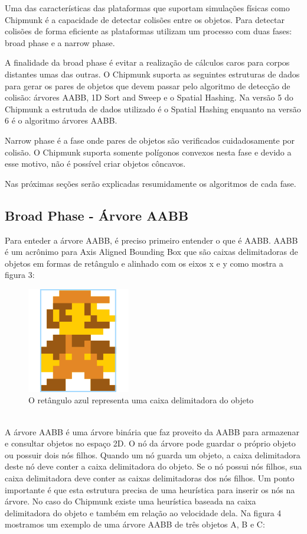 Uma das características das plataformas que suportam simulações físicas como Chipmunk é a capacidade de detectar colisões entre os objetos. 
Para detectar colisões de forma eficiente as plataformas utilizam um processo com duas fases: broad phase e a narrow phase. 

A finalidade da broad phase é evitar a realização de cálculos caros para corpos distantes umas das outras. O Chipmunk suporta as seguintes estruturas de dados para
gerar os pares de objetos que devem passar pelo algoritmo de detecção de colisão:
árvores AABB, 1D Sort and Sweep e o Spatial Hashing. Na versão 5 do Chipmunk a estrutuda de dados utilizado é o Spatial Hashing enquanto na versão 6
é o algoritmo árvores AABB. 

Narrow phase é a fase onde pares de objetos são verificados cuidadosamente por colisão. O Chipmunk suporta somente polígonos convexos nesta fase e devido a 
esse motivo, não é possível criar objetos côncavos.

Nas próximas seções serão explicadas resumidamente os algoritmos de cada fase.

\subsection{Broad Phase - Árvore AABB}

Para enteder a árvore AABB, é preciso primeiro entender o que é AABB. AABB é um acrônimo para Axis Aligned Bounding Box que são caixas delimitadoras de objetos 
em formas de retângulo e alinhado com os eixos x e y como mostra a figura 3:

\begin{figure}[!htbp]
  \centering
  \includegraphics[scale=0.3]{mario_bb.png}
  \caption{O retângulo azul representa uma caixa delimitadora do objeto}
\end{figure}

\ \\
A árvore AABB é uma árvore binária que faz proveito da AABB para armazenar e consultar objetos no espaço 2D. O nó da árvore pode guardar o próprio objeto 
ou possuir dois nós filhos. Quando um nó guarda um objeto, a caixa delimitadora deste nó deve conter a caixa delimitadora do objeto. Se o nó possui nós filhos, 
sua caixa delimitadora deve conter as caixas delimitadoras dos nós filhos. 
Um ponto importante é que esta estrutura precisa de uma heurística para inserir os nós na árvore. No caso do Chipmunk existe uma heurística baseada na caixa 
delimitadora do objeto e também em relação ao velocidade dela. Na figura 4 mostramos um exemplo de uma árvore AABB de três objetos A, B e C: 

